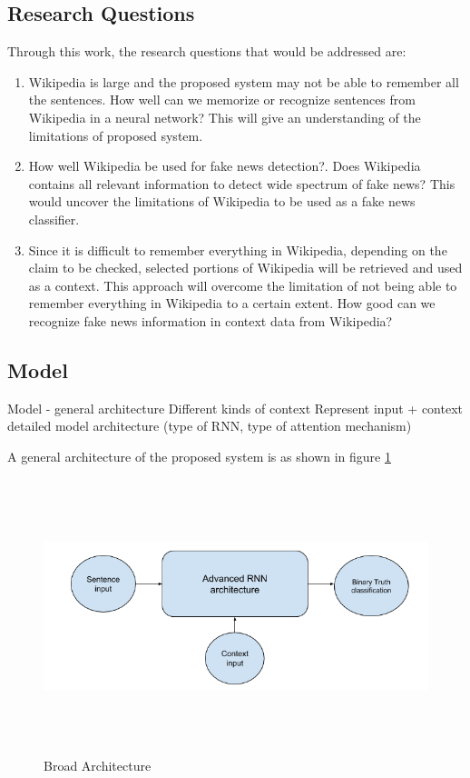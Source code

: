 \documentclass[a4paper, 11pt]{article}
\begin{document}
\subsection{Research Questions}

Through this work, the research questions that would be addressed are:
\begin{enumerate}
\item  Wikipedia is large and the proposed system may not be able to remember all the sentences. How well can we memorize or recognize sentences from Wikipedia in a neural network? This will give an understanding of the limitations of proposed system. 
\item How well Wikipedia be used for fake news detection?. Does Wikipedia contains all relevant information to detect wide spectrum of fake news? This would uncover the limitations of Wikipedia to be used as a fake news classifier. 
\item Since it is difficult to remember everything in Wikipedia, depending on the claim to be checked, selected portions of Wikipedia will be retrieved and used as a context. This approach will overcome the limitation of not being able to remember everything in Wikipedia to a certain extent. How good can we recognize fake news information in context data from Wikipedia?
\end{enumerate}

\subsection{Model}

Model - general architecture
Different kinds of context
Represent input + context
detailed model architecture (type of RNN, type of attention mechanism)

 A general architecture of the proposed system is as shown in figure \ref{fig:broad_architecture}

\begin{figure}[htpb]
    \centering
    \includegraphics[width=\textwidth,height=8cm,keepaspectratio=true]
    {broad-architecture-diagram.png}
    \caption{
        Broad Architecture
    }
    \label{fig:broad_architecture}
\end{figure}
\end{document}
